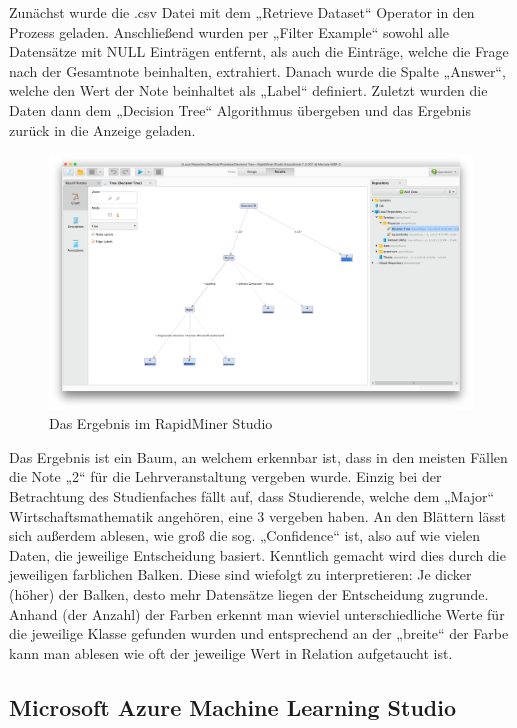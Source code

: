 Zunächst wurde die .csv Datei mit dem „Retrieve Dataset“ Operator in den Prozess
geladen. Anschließend wurden per „Filter Example“ sowohl alle Datensätze mit
NULL Einträgen entfernt, als auch die Einträge, welche die Frage nach der
Gesamtnote beinhalten, extrahiert. Danach wurde die Spalte „Answer“, welche den
Wert der Note beinhaltet als „Label“ definiert. Zuletzt wurden die Daten dann
dem „Decision Tree“ Algorithmus übergeben und das Ergebnis zurück in die Anzeige
geladen.

\begin{figure}[htb]
	\includegraphics[width=\textwidth]{gfx/rmres.png}
	\caption{Das Ergebnis im RapidMiner Studio}
	\label{fig:example:impl:rm:res}
\end{figure}

Das Ergebnis ist ein Baum, an welchem erkennbar ist, dass in den meisten Fällen
die Note „2“ für die Lehrveranstaltung vergeben wurde. Einzig bei der
Betrachtung des Studienfaches fällt auf, dass Studierende, welche dem „Major“
Wirtschaftsmathematik angehören, eine 3 vergeben haben. An den Blättern lässt
sich außerdem ablesen, wie groß die sog. „Confidence“ ist, also auf wie vielen
Daten, die jeweilige Entscheidung basiert. Kenntlich gemacht wird dies durch
die jeweiligen farblichen Balken. Diese sind wiefolgt zu interpretieren: Je
dicker (höher) der Balken, desto mehr Datensätze liegen der Entscheidung
zugrunde. Anhand (der Anzahl) der Farben erkennt man wieviel unterschiedliche
Werte für die jeweilige Klasse gefunden wurden und entsprechend an der „breite“
der Farbe kann man ablesen wie oft der jeweilige Wert in Relation aufgetaucht
ist.

\subsection{Microsoft Azure Machine Learning Studio}
\label{sec:example:impl:msa}

